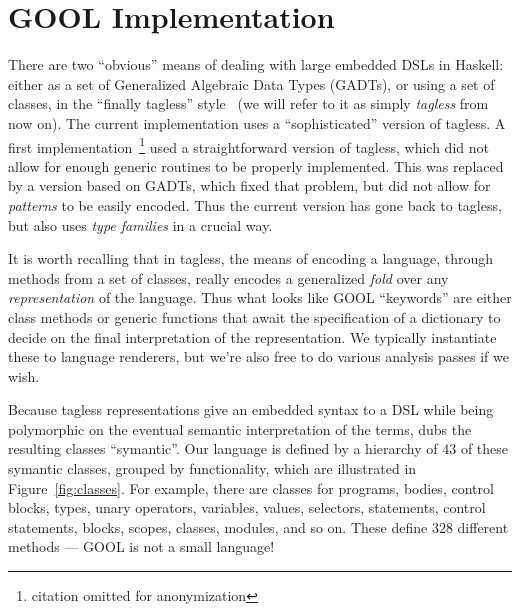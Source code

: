 \documentclass[sigplan,review,anonymous,prologue,dvipsnames]{acmart}
\begin{document}
\section{GOOL Implementation} \label{sec:implementation}

There are two ``obvious'' means of dealing with large embedded DSLs in Haskell:
either as a set of Generalized Algebraic Data Types (GADTs), or using a set of
classes, in the ``finally tagless'' style~\cite{carette2009finally} (we will
refer to it as simply \emph{tagless} from now on).  The current implementation
uses a ``sophisticated'' version of tagless. A first
implementation~\footnote{citation omitted for anonymization} used a
straightforward version of tagless, which did not allow for enough generic
routines to be properly implemented.  This was replaced by a version based on
GADTs, which fixed that problem, but did not allow for \emph{patterns} to be
easily encoded. Thus the current version has gone back to tagless, but also uses
\emph{type families} in a crucial way.

It is worth recalling that in tagless, the means of encoding a language,
through methods from a set of classes, really encodes a generalized
\emph{fold} over any \emph{representation} of the language.  Thus what
looks like GOOL ``keywords'' are either class methods or generic functions
that await the specification of a dictionary to decide on the final
interpretation of the representation.  We typically instantiate these to
language renderers, but we're also free to do various analysis passes if
we wish.

Because tagless representations give an embedded syntax to a DSL while
being polymorphic on the eventual semantic interpretation of the terms,
\cite{carette2009finally} dubs the resulting classes ``symantic''.
Our language is defined by a hierarchy of $43$ of these symantic classes,
grouped by functionality, which are illustrated in Figure~\ref{fig:classes}.  
For example, there are classes for programs,
bodies, control blocks, types, unary operators, variables, values, selectors,
statements, control statements, blocks, scopes, classes, modules, and so
on.  These define $328$ different methods --- GOOL is not a small language!
\end{document}
